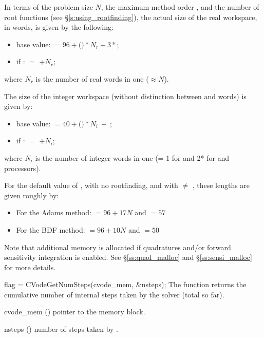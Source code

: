 {
  In terms of the problem size $N$, the maximum method order , and
  the number  of root functions (see \S\ref{s:using_rootfinding}),
  the actual size of the real workspace, in  words, is
  given by the following:
  \begin{itemize}
  \item base value:  $= 96 + ($$)*N_r + 3*$;
  \item if :  $=$  $+ N_r$;
  \end{itemize}
  where $N_r$ is the number of real words in one  ($\approx N$).

  The size of the integer workspace (without distinction between  
  and  words) is given by:
  \begin{itemize}
  \item base value:  $= 40 + ($$)*N_i ~ + ~ $;  
  \item if :  $=$  $+ N_i$;
  \end{itemize}
  where $N_i$ is the number of integer words in one 
  (= 1 for {\nvecs} and 2* for {\nvecp} and  processors).

  For the default value of , with no rootfinding, and with
   $\neq$ , these lengths are given roughly by:
  \begin{itemize}
  \item For the Adams method:  $= 96 + 17N$ and  $= 57$ 
  \item For the BDF method:  $= 96 + 10N$ and  $= 50$ 
  \end{itemize}

  Note that additional memory is allocated if quadratures and/or forward sensitivity
  integration is enabled. See \S\ref{ss:quad_malloc} and \S\ref{ss:sensi_malloc}
  for more details.
}
{
  flag = CVodeGetNumSteps(cvode\_mem, \&nsteps);
}
{
  The function  returns the cumulative number of internal 
  steps taken by the solver (total so far).
}
{
  \begin{args}
  \item[cvode\_mem] ()
    pointer to the {\cvodes} memory block.
  \item[nsteps] ()
    number of steps taken by {\cvodes}.
  \end{args}
}
